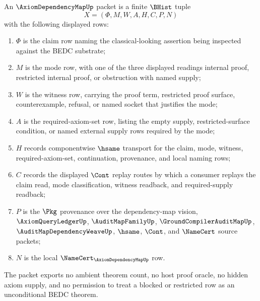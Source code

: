 \begin{definition}
\label{def:axiom-dependency-map-certificate}
An $\AxiomDependencyMapUp$ packet is a finite $\BHist$ tuple
$$
X=(\Phi,M,W,A,H,C,P,N)
$$
with the following displayed rows:
\begin{enumerate}
\item $\Phi$ is the claim row naming the classical-looking assertion being inspected against the BEDC substrate;
\item $M$ is the mode row, with one of the three displayed readings internal proof, restricted internal proof, or obstruction with named supply;
\item $W$ is the witness row, carrying the proof term, restricted proof surface, counterexample, refusal, or named socket that justifies the mode;
\item $A$ is the required-axiom-set row, listing the empty supply, restricted-surface condition, or named external supply rows required by the mode;
\item $H$ records componentwise $\hsame$ transport for the claim, mode, witness, required-axiom-set, continuation, provenance, and local naming rows;
\item $C$ records the displayed $\Cont$ replay routes by which a consumer replays the claim read, mode classification, witness readback, and required-supply readback;
\item $P$ is the $\Pkg$ provenance over the dependency-map vision, $\AxiomQueryLedgerUp$, $\AuditMapFamilyUp$, $\GroundCompilerAuditMapUp$, $\AuditMapDependencyWeaveUp$, $\hsame$, $\Cont$, and $\NameCert$ source packets;
\item $N$ is the local $\NameCert_{\AxiomDependencyMapUp}$ row.
\end{enumerate}
The packet exports no ambient theorem count, no host proof oracle, no hidden axiom supply, and no permission to treat a blocked or restricted row as an unconditional BEDC theorem.
\end{definition}

